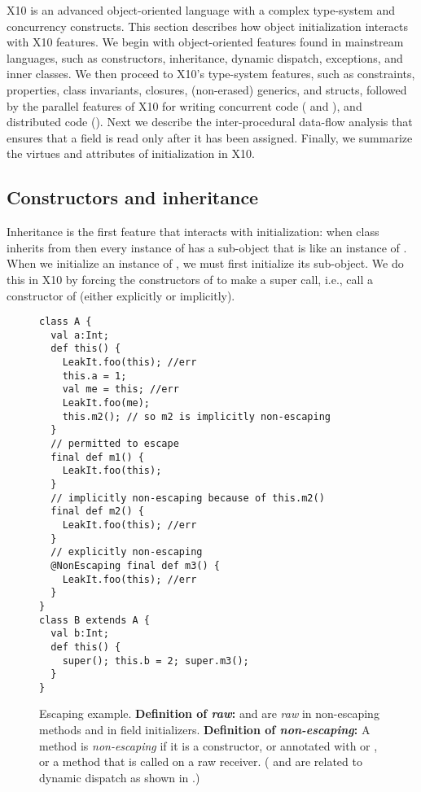 X10 is an advanced object-oriented language with a complex type-system
    and concurrency constructs.
This section describes how object initialization interacts with X10 features.
We begin with object-oriented features found in mainstream languages,
    such as constructors, inheritance, dynamic dispatch, exceptions, and inner classes.
We then proceed to X10's type-system features,
    such as constraints, properties, class invariants, closures, (non-erased) generics, and structs,
followed by the parallel features of X10 for writing concurrent code ( and ),
    and distributed code ().
Next we describe the inter-procedural data-flow analysis that ensures that
    a field is read only after it has been assigned.
Finally, we summarize the virtues and attributes of initialization in X10.


\subsection{Constructors and inheritance}
Inheritance is the first feature that interacts with initialization:
    when class  inherits from 
    then every instance of  has a sub-object that is like an instance of .
When we initialize an instance of , we must first initialize its  sub-object.
We do this in X10 by forcing the constructors of  to make a super call,
    i.e., call a constructor of 
    (either explicitly or implicitly).



\begin{figure}
\vspace{-0.2cm}\begin{lstlisting}
class A {
  val a:Int;
  def this() {
    LeakIt.foo(this); //err
    this.a = 1;
    val me = this; //err
    LeakIt.foo(me);
    this.m2(); // so m2 is implicitly non-escaping
  }
  // permitted to escape
  final def m1() {
    LeakIt.foo(this);
  }
  // implicitly non-escaping because of this.m2()
  final def m2() {
    LeakIt.foo(this); //err
  }
  // explicitly non-escaping
  @NonEscaping final def m3() {
    LeakIt.foo(this); //err
  }
}
class B extends A {
  val b:Int;
  def this() {
    super(); this.b = 2; super.m3();
  }
}
\end{lstlisting}\vspace{-0.2cm}
\caption{Escaping \this example.
    \textbf{Definition of \emph{raw}:}
    {\this and  are \emph{raw} in {non-escaping} methods and in field initializers}.
    \textbf{Definition of \emph{non-escaping}:}
        {A method is \emph{non-escaping} if it is a constructor,
            or annotated with  or ,
            or a method that is called on a raw \this receiver}.
    ( and  are related
        to dynamic dispatch as shown in .)}
\label{Figure:Escaping-this}
\end{figure}

